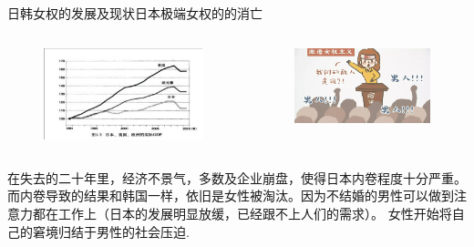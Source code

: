 \documentclass{beamer}
\begin{document}
	\begin{frame}{日韩女权的发展及现状}{日本极端女权的的消亡}
		\begin{columns}
			\begin{figure}
				\centering
				\includegraphics[width=\textwidth]{img/图片21.png}
			\end{figure}

			\begin{figure}
				\centering
				\includegraphics[width=\textwidth]{img/图片22.png}
			\end{figure}
		\end{columns}
		在失去的二十年里，经济不景气，多数及企业崩盘，使得日本内卷程度十分严重。而内卷导致的结果和韩国一样，依旧是女性被淘汰。因为不结婚的男性可以做到注意力都在工作上（日本的发展明显放缓，已经跟不上人们的需求）。
		女性开始将自己的窘境归结于男性的社会压迫.
	\end{frame}
\end{document}
